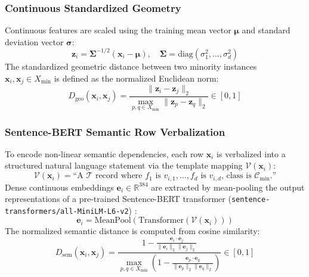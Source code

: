 \documentclass[sn-basic]{sn-jnl}
\begin{document}
\subsubsection{Continuous Standardized Geometry}
Continuous features are scaled using the training mean vector $\boldsymbol{\mu}$ and standard deviation vector $\boldsymbol{\sigma}$:
\begin{equation}
\label{eq:standardization}
\mathbf{z}_i = \mathbf{\Sigma}^{-1/2} (\mathbf{x}_i - \boldsymbol{\mu}), \quad \mathbf{\Sigma} = \text{diag}(\sigma_1^2, \dots, \sigma_d^2)
\end{equation}
The standardized geometric distance between two minority instances $\mathbf{x}_i, \mathbf{x}_j \in X_{\min}$ is defined as the normalized Euclidean norm:
\begin{equation}
\label{eq:geo_distance}
D_{\text{geo}}(\mathbf{x}_i, \mathbf{x}_j) = \frac{\|\mathbf{z}_i - \mathbf{z}_j\|_2}{\max_{p, q \in X_{\min}} \|\mathbf{z}_p - \mathbf{z}_q\|_2} \in [0, 1]
\end{equation}

\subsubsection{Sentence-BERT Semantic Row Verbalization}
To encode non-linear semantic dependencies, each row $\mathbf{x}_i$ is verbalized into a structured natural language statement via the template mapping $\mathcal{V}(\mathbf{x}_i)$:
\begin{equation}
\label{eq:verbalization}
\mathcal{V}(\mathbf{x}_i) = \text{``A } \mathcal{T} \text{ record where } f_1 \text{ is } v_{i,1}, \dots, f_d \text{ is } v_{i,d}\text{, class is } \mathcal{C}_{\min}\text{.''}
\end{equation}
Dense continuous embeddings $\mathbf{e}_i \in \mathbb{R}^{384}$ are extracted by mean-pooling the output representations of a pre-trained Sentence-BERT transformer (\texttt{sentence-transformers/all-MiniLM-L6-v2}) \citep{reimers2019sentence}:
\begin{equation}
\label{eq:sbert_embedding}
\mathbf{e}_i = \text{MeanPool}\left( \text{Transformer}\left(\mathcal{V}(\mathbf{x}_i)\right) \right)
\end{equation}
The normalized semantic distance is computed from cosine similarity:
\begin{equation}
\label{eq:sem_distance}
D_{\text{sem}}(\mathbf{x}_i, \mathbf{x}_j) = \frac{1 - \frac{\mathbf{e}_i \cdot \mathbf{e}_j}{\|\mathbf{e}_i\|_2 \|\mathbf{e}_j\|_2}}{\max_{p, q \in X_{\min}} \left( 1 - \frac{\mathbf{e}_p \cdot \mathbf{e}_q}{\|\mathbf{e}_p\|_2 \|\mathbf{e}_q\|_2} \right)} \in [0, 1]
\end{equation}
\end{document}
